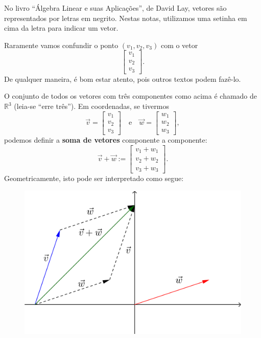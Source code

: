 No livro ``Álgebra Linear e suas Aplicações'', de David Lay, vetores são representados por letras em negrito. Nestas notas, utilizamos uma setinha em cima da letra para indicar um vetor.

Raramente vamos confundir o ponto $(v_1, v_2, v_3)$ com o vetor
\begin{equation}
\left[
\begin{array}{c}
v_1 \\
v_2 \\
v_3
\end{array}
\right].
\end{equation} De qualquer maneira, é bom estar atento, pois outros textos podem fazê-lo.

O conjunto de todos os vetores com três componentes como acima é chamado de $\mathbb{R}^3$ (leia-se ``erre três''). Em coordenadas, se tivermos
\begin{equation}
\vec{v} =
\left[
  \begin{array}{c}
    v_1 \\
    v_2 \\
    v_3
  \end{array}
\right]  \quad  \text{e} \quad
\vec{w} =
\left[
  \begin{array}{c}
    w_1 \\
    w_2 \\
    w_3
  \end{array}
\right],
\end{equation} podemos definir a \textbf{soma de vetores} componente a componente:
\begin{equation}
\vec{v} + \vec{w} :=
\left[
  \begin{array}{c}
    v_1 + w_1 \\
    v_2 + w_2 \\
    v_3 + w_3
  \end{array}
\right].
\end{equation} Geometricamente, isto pode ser interpretado como segue:
\begin{figure}[h!]
\begin{center}
\includegraphics[width=0.3\linewidth]{Semana02/semana02-soma}
\end{center}
\end{figure}

